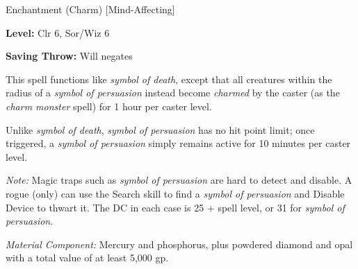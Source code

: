 
Enchantment (Charm) [Mind-Affecting]

\textbf{Level:} Clr 6, Sor/Wiz 6

\textbf{Saving Throw:} Will negates

This spell functions like \textit{symbol of death}, except that all creatures within 
the radius of a \textit{symbol of persuasion} instead become \textit{charmed} by 
the caster (as the \textit{charm monster} spell) for 1 hour per caster level.

Unlike \textit{symbol of death}, \textit{symbol of persuasion} has no hit point 
limit; once triggered, a \textit{symbol of persuasion} simply remains active for 
10 minutes per caster level.

\textit{Note:} Magic traps such as \textit{symbol of persuasion} are hard to detect 
and disable. A rogue (only) can use the Search skill to find a \textit{symbol of 
persuasion} and Disable Device to thwart it. The DC in each case is 25 + spell 
level, or 31 for \textit{symbol of persuasion}.

\textit{Material Component:} Mercury and phosphorus, plus powdered diamond and 
opal with a total value of at least 5,000 gp.

